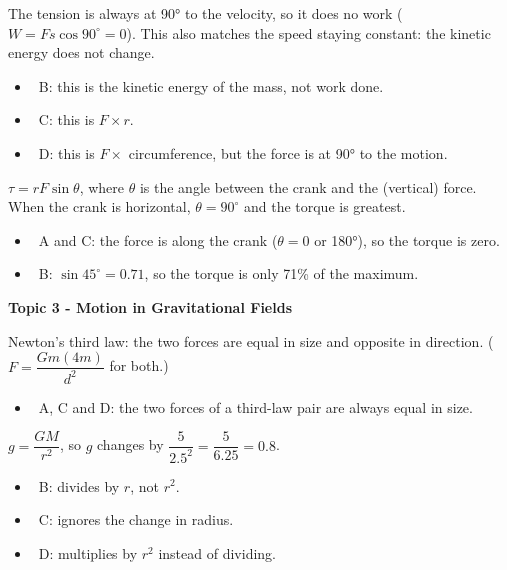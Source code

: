\documentclass[12pt]{article}
\newcommand\anstopic[1]{\par\Needspace{8\baselineskip}\vspace{4mm}%
  \begin{center}{\headfont\bfseries\fontsize{14}{18}\selectfont #1\par}\end{center}\vspace{2pt}}
\begin{document}
\begin{practiceanswers}
\begin{practiceans}
  The tension is always at \ang{90} to the velocity, so it does no work ($W = Fs\cos 90^\circ = 0$).
  This also matches the speed staying constant: the kinetic energy does not change.
  \begin{itemize}
    \item \xmark\ B: this is the kinetic energy of the mass, not work done.
    \item \xmark\ C: this is $F \times r$.
    \item \xmark\ D: this is $F \times$ circumference, but the force is at \ang{90} to the motion.
  \end{itemize}
\end{practiceans}

\begin{practiceans}
  $\tau = rF\sin\theta$, where $\theta$ is the angle between the crank and the (vertical) force.
  When the crank is horizontal, $\theta = 90^\circ$ and the torque is greatest.
  \begin{itemize}
    \item \xmark\ A and C: the force is along the crank ($\theta = 0$ or \ang{180}), so the torque is
          zero.
    \item \xmark\ B: $\sin 45^\circ = 0.71$, so the torque is only 71\% of the maximum.
  \end{itemize}
\end{practiceans}

\anstopic{Topic 3 - Motion in Gravitational Fields}

\begin{practiceans}
  Newton's third law: the two forces are equal in size and opposite in direction. ($F =
  \dfrac{Gm(4m)}{d^2}$ for both.)
  \begin{itemize}
    \item \xmark\ A, C and D: the two forces of a third-law pair are always equal in size.
  \end{itemize}
\end{practiceans}

\begin{practiceans}
  $g = \dfrac{GM}{r^2}$, so $g$ changes by $\dfrac{5}{2.5^2} = \dfrac{5}{6.25} = 0.8$.
  \begin{itemize}
    \item \xmark\ B: divides by $r$, not $r^2$.
    \item \xmark\ C: ignores the change in radius.
    \item \xmark\ D: multiplies by $r^2$ instead of dividing.
  \end{itemize}
\end{practiceans}


\end{practiceanswers}
\end{document}
